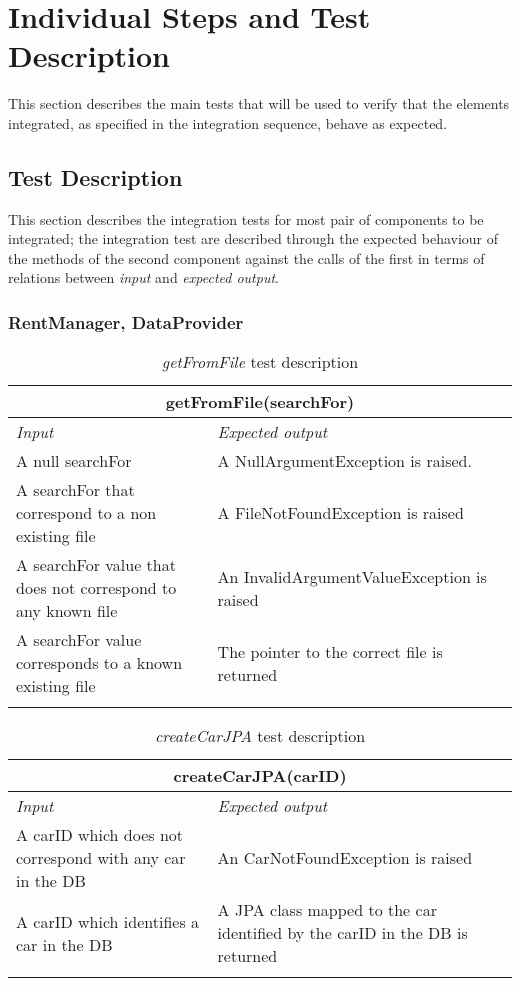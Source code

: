 \section{Individual Steps and Test Description}

This section describes the main tests that will be used to verify that the elements integrated, as specified in the integration sequence, behave as expected. 

\subsection{Test Description}

This section describes the integration tests for most pair of components to be integrated; the integration test are described through the expected behaviour of the methods of the second component against the calls of the first in terms of relations between \emph{input} and \emph{expected output}.

\subsubsection{RentManager, DataProvider}

\begin{longtable}{p{0.4\linewidth}p{0.6\linewidth}}
\multicolumn{2}{c}{\textbf{getFromFile(searchFor)}} \\
\toprule
\emph{Input} & \emph{Expected output} \\
\midrule
A null searchFor & A NullArgumentException is raised.\\
\midrule
A searchFor that correspond to a non existing file & A FileNotFoundException is raised \\
\midrule
A searchFor value that does not correspond to any known file & An InvalidArgumentValueException is raised \\
\midrule
A searchFor value corresponds to a known existing file & The pointer to the correct file is returned \\
\bottomrule
\caption{\emph{getFromFile} test description}
\end{longtable}


\begin{longtable}{p{0.4\linewidth}p{0.6\linewidth}}
\multicolumn{2}{c}{\textbf{createCarJPA(carID)}} \\
\toprule
\emph{Input} & \emph{Expected output} \\
\midrule
A carID which does not correspond with any car in the DB & An CarNotFoundException is raised \\
\midrule
A carID which identifies a car in the DB & A JPA class mapped to the car identified by the carID in the DB is returned \\
\bottomrule
\caption{\label{tbl:createCarJPA}\emph{createCarJPA} test description}
\end{longtable}

